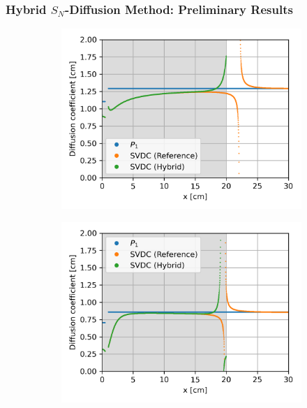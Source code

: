 \begin{frame}
  \frametitle{Hybrid $S_N$-Diffusion Method: Preliminary Results}
  \begin{figure}
    \centering
    \begin{subfigure}[t]{.35\textwidth}
      \centering
      \includegraphics[width=\textwidth]{images/case-3b-group-1-diffcoef}
      \label{fig:c3bg1dc}
    \end{subfigure}
    \begin{subfigure}[t]{.35\textwidth}
      \centering
      \includegraphics[width=\textwidth]{images/case-3b-group-2-diffcoef}
      \label{fig:c3bg2dc}
    \end{subfigure}
    \begin{subfigure}[t]{.35\textwidth}

\end{subfigure}
\end{figure}
\end{frame}
